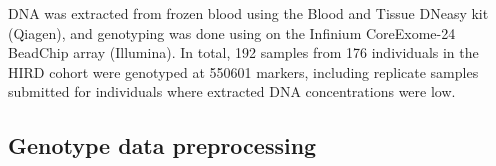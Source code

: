 DNA was extracted from frozen blood using the Blood and Tissue DNeasy kit (Qiagen), and genotyping was done using on the Infinium CoreExome-24 BeadChip array (Illumina).
In total, 192 samples from 176 individuals in the \gls{HIRD} cohort were genotyped at \num{550601} markers, including replicate samples submitted for individuals where extracted DNA concentrations were low.

\subsection{Genotype data preprocessing}
\label{subsec:hird_dge_genotype_preproc}


